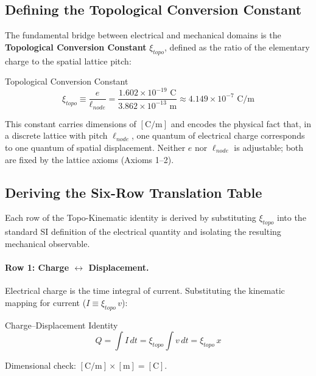 \subsection{Defining the Topological Conversion Constant}

The fundamental bridge between electrical and mechanical domains is the \textbf{Topological Conversion Constant} $\xi_{topo}$, defined as the ratio of the elementary charge to the spatial lattice pitch:
\begin{resultbox}{Topological Conversion Constant}
\begin{equation}
    \xi_{topo} \equiv \frac{e}{\ell_{node}} = \frac{1.602 \times 10^{-19} \text{ C}}{3.862 \times 10^{-13} \text{ m}} \approx 4.149 \times 10^{-7} \text{ C/m}
    \label{eq:xi_topo_vca}
\end{equation}
\end{resultbox}

This constant carries dimensions of $[\text{C/m}]$ and encodes the physical fact that, in a discrete lattice with pitch $\ell_{node}$, one quantum of electrical charge corresponds to one quantum of spatial displacement. Neither $e$ nor $\ell_{node}$ is adjustable; both are fixed by the lattice axioms (Axioms 1--2).

\subsection{Deriving the Six-Row Translation Table}

Each row of the Topo-Kinematic identity is derived by substituting $\xi_{topo}$ into the standard SI definition of the electrical quantity and isolating the resulting mechanical observable.

\paragraph{Row 1: Charge $\leftrightarrow$ Displacement.}
Electrical charge is the time integral of current. Substituting the kinematic mapping for current ($I \equiv \xi_{topo}\, v$):
\begin{resultbox}{Charge--Displacement Identity}
\begin{equation}
    Q = \int I \, dt = \xi_{topo} \int v \, dt = \xi_{topo}\, x
    \label{eq:charge_displacement}
\end{equation}
\end{resultbox}
\noindent Dimensional check: $[\text{C/m}] \times [\text{m}] = [\text{C}]$. \checkmark

